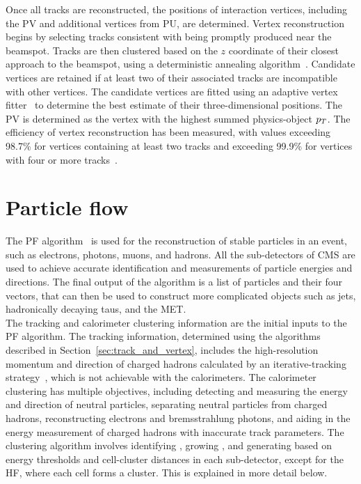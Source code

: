 Once all tracks are reconstructed, the positions of interaction vertices, including the \ac{PV} and additional vertices from \ac{PU}, are determined. 
Vertex reconstruction begins by selecting tracks consistent with being promptly produced near the beamspot. 
Tracks are then clustered based on the $z$ coordinate of their closest approach to the beamspot, using a deterministic annealing algorithm~\cite{Rose:1998dzq}. 
Candidate vertices are retained if at least two of their associated tracks are incompatible with other vertices. 
The candidate vertices are fitted using an adaptive vertex fitter~\cite{Fruhwirth:2007hz} to determine the best estimate of their three-dimensional positions. 
The \ac{PV} is determined as the vertex with the highest summed physics-object $p_{T}$.
The efficiency of vertex reconstruction has been measured, with values exceeding 98.7\% for vertices containing at least two tracks and exceeding 99.9\% for vertices with four or more tracks~\cite{CMS:2010mua}. 

\section{Particle flow}

The \ac{PF} algorithm~\cite{PF_CMS,CMS:2010byl,CMS:2010eua} is used for the reconstruction of stable particles in an event, such as electrons, photons, muons, and hadrons. 
All the sub-detectors of \ac{CMS} are used to achieve accurate identification and measurements of particle energies and directions. 
The final output of the algorithm is a list of particles and their four vectors, that can then be used to construct more complicated objects such as jets, hadronically decaying taus, and the \ac{MET}.\\

The tracking and calorimeter clustering information are the initial inputs to the \ac{PF} algorithm.
The tracking information, determined using the algorithms described in Section~\ref{sec:track_and_vertex}, includes the high-resolution momentum and direction of charged hadrons calculated by an iterative-tracking strategy~\cite{Adam:934067}, which is not achievable with the calorimeters.
The calorimeter clustering has multiple objectives, including detecting and measuring the energy and direction of neutral particles, separating neutral particles from charged hadrons, reconstructing electrons and bremsstrahlung photons, and aiding in the energy measurement of charged hadrons with inaccurate track parameters. 
The clustering algorithm involves identifying , growing , and generating  based on energy thresholds and cell-cluster distances in each sub-detector, except for the \ac{HF}, where each cell forms a cluster.
This is explained in more detail below. \\

